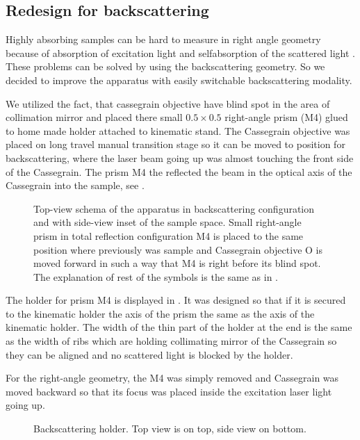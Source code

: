 \subsection{Redesign for backscattering}

Highly absorbing samples can be hard to measure in right angle geometry
because of absorption of excitation light and selfabsorption of the scattered
light \parencite{Shriver1974}. These problems can be solved by using the
backscattering geometry. So we decided to improve the apparatus with easily
switchable backscattering modality.

We utilized the fact, that cassegrain objective have blind spot in the area of
collimation mirror and placed there small $0.5 \times 0.5$ right-angle prism
(M4) glued to home made holder attached to kinematic stand. The Cassegrain
objective was placed on long travel manual transition stage so it can be moved
to position for backscattering, where the laser beam going up was almost
touching the front side of the Cassegrain. The prism M4 the reflected the beam
in the optical axis of the Cassegrain into the sample, see
.

\begin{figure}
	\centering
	
	\caption{Top-view schema of the apparatus in backscattering configuration
		and with side-view inset of the sample space. Small right-angle prism in
		total reflection configuration M4 is placed to the same position where
		previously was sample and Cassegrain objective O is moved forward in such
		a way that M4 is right before its blind spot. The explanation of rest of
		the symbols is the same as in
		.}
	\label{\figlabel{backscattering:apparatus_schema}}
\end{figure}

The holder for prism M4 is displayed in
.
It was designed so that if it is secured to the kinematic holder the axis
of the prism the same as the axis of the kinematic holder. The width of the
thin part of the holder at the end is the same as the width of ribs which
are holding collimating mirror of the Cassegrain so they can be aligned and
no scattered light is blocked by the holder.

For the right-angle geometry, the M4 was simply removed and Cassegrain was
moved backward so that its focus was placed inside the excitation laser light
going up.

\begin{figure}
	\centering
	
	\caption{Backscattering holder. Top view is on top, side view on bottom.}
	\label{\figlabel{backscattering_holder:drawing}}
\end{figure}
